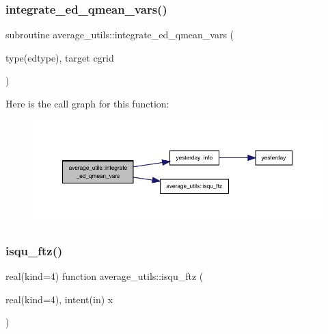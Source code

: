 \subsubsection{\texorpdfstring{integrate\+\_\+ed\+\_\+qmean\+\_\+vars()}{integrate\_ed\_qmean\_vars()}}
{\footnotesize\ttfamily subroutine average\+\_\+utils\+::integrate\+\_\+ed\+\_\+qmean\+\_\+vars (\begin{DoxyParamCaption}\item[{type(edtype), target}]{cgrid }\end{DoxyParamCaption})}

Here is the call graph for this function\+:
\nopagebreak
\begin{figure}[H]
\begin{center}
\leavevmode
\includegraphics[width=350pt]{namespaceaverage__utils_af429d166f6097c18d6ab4ce05adbd31f_cgraph}
\end{center}
\end{figure}
\mbox{\label{namespaceaverage__utils_ac90817fe39c27153ed7bbee2cb856611}} 
\subsubsection{\texorpdfstring{isqu\+\_\+ftz()}{isqu\_ftz()}}
{\footnotesize\ttfamily real(kind=4) function average\+\_\+utils\+::isqu\+\_\+ftz (\begin{DoxyParamCaption}\item[{real(kind=4), intent(in)}]{x }\end{DoxyParamCaption})}

